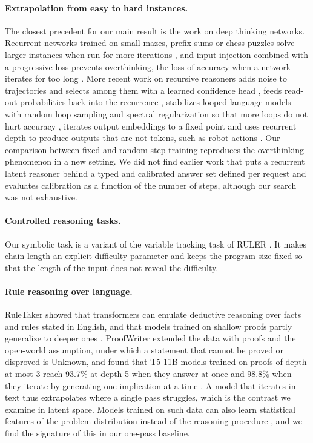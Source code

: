 \documentclass{article}
\begin{document}
\paragraph{Extrapolation from easy to hard instances.} The closest precedent for our main result is the work on deep thinking networks. Recurrent networks trained on small mazes, prefix sums or chess puzzles solve larger instances when run for more iterations \cite{schwarzschild2021learn}, and input injection combined with a progressive loss prevents overthinking, the loss of accuracy when a network iterates for too long \cite{bansal2022endtoend}. More recent work on recursive reasoners adds noise to trajectories and selects among them with a learned confidence head \cite{sghaier2026ptrm}, feeds read-out probabilities back into the recurrence \cite{kamiya2026rofb}, stabilizes looped language models with random loop sampling and spectral regularization so that more loops do not hurt accuracy \cite{yang2026stars}, iterates output embeddings to a fixed point \cite{feinashley2026attractor} and uses recurrent depth to produce outputs that are not tokens, such as robot actions \cite{tur2026rdvla}. Our comparison between fixed and random step training reproduces the overthinking phenomenon in a new setting. We did not find earlier work that puts a recurrent latent reasoner behind a typed and calibrated answer set defined per request and evaluates calibration as a function of the number of steps, although our search was not exhaustive.

\paragraph{Controlled reasoning tasks.} Our symbolic task is a variant of the variable tracking task of RULER \cite{hsieh2024ruler}. It makes chain length an explicit difficulty parameter and keeps the program size fixed so that the length of the input does not reveal the difficulty.

\paragraph{Rule reasoning over language.} RuleTaker showed that transformers can emulate deductive reasoning over facts and rules stated in English, and that models trained on shallow proofs partly generalize to deeper ones \cite{clark2020ruletaker}. ProofWriter extended the data with proofs and the open-world assumption, under which a statement that cannot be proved or disproved is Unknown, and found that T5-11B models trained on proofs of depth at most 3 reach 93.7\% at depth 5 when they answer at once and 98.8\% when they iterate by generating one implication at a time \cite{tafjord2021proofwriter}. A model that iterates in text thus extrapolates where a single pass struggles, which is the contrast we examine in latent space. Models trained on such data can also learn statistical features of the problem distribution instead of the reasoning procedure \cite{zhang2023paradox}, and we find the signature of this in our one-pass baseline.
\end{document}
